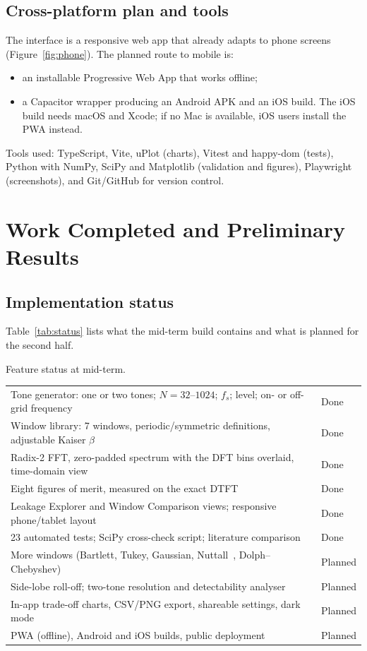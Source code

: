 \documentclass[11pt,a4paper]{article}
\makeatletter
\newenvironment{fixedtable}{\par\noindent\begin{minipage}{\linewidth}\centering\def\@captype{table}}%
  {\end{minipage}\par\medskip}
\makeatother
\begin{document}
\subsection{Cross-platform plan and tools}
The interface is a responsive web app that already adapts to phone screens (Figure~\ref{fig:phone}).
The planned route to mobile is:
\begin{itemize}
  \item an installable Progressive Web App that works offline;
  \item a Capacitor wrapper producing an Android APK and an iOS build. The iOS build needs
        macOS and Xcode; if no Mac is available, iOS users install the PWA instead.
\end{itemize}
Tools used: TypeScript, Vite, uPlot (charts), Vitest and happy-dom (tests), Python with NumPy,
SciPy and Matplotlib (validation and figures), Playwright (screenshots), and Git/GitHub for
version control.

\section{Work Completed and Preliminary Results}

\subsection{Implementation status}
Table~\ref{tab:status} lists what the mid-term build contains and what is planned for the
second half.

\begin{fixedtable}
  \small
  \caption{Feature status at mid-term.}
  \label{tab:status}
  \begin{tabularx}{\linewidth}{Yl}
    \hline
    Tone generator: one or two tones; $N=32$--$1024$; $f_s$; level; on- or off-grid frequency & Done \\
    Window library: 7 windows, periodic/symmetric definitions, adjustable Kaiser $\beta$ & Done \\
    Radix-2 FFT, zero-padded spectrum with the DFT bins overlaid, time-domain view & Done \\
    Eight figures of merit, measured on the exact DTFT & Done \\
    Leakage Explorer and Window Comparison views; responsive phone/tablet layout & Done \\
    23 automated tests; SciPy cross-check script; literature comparison & Done \\
    More windows (Bartlett, Tukey, Gaussian, Nuttall~\cite{nuttall}, Dolph--Chebyshev) & Planned \\
    Side-lobe roll-off; two-tone resolution and detectability analyser & Planned \\
    In-app trade-off charts, CSV/PNG export, shareable settings, dark mode & Planned \\
    PWA (offline), Android and iOS builds, public deployment & Planned \\
    \hline
  \end{tabularx}
\end{fixedtable}
\end{document}
